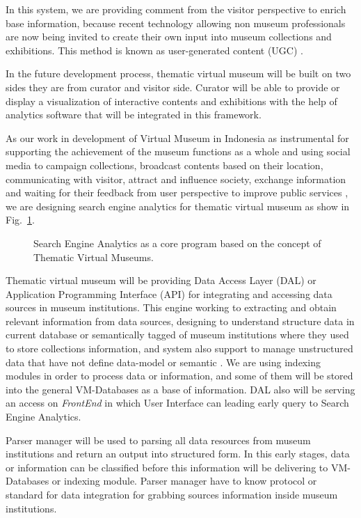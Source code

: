 In this system, we are providing comment from the visitor perspective to enrich base information, because recent technology allowing non museum professionals are now being invited to create their own input into museum collections and exhibitions. This method is known as user-generated content (UGC) \cite{HellinHobbs}.

In the future development process, thematic virtual museum will be built on two sides they are from curator and visitor side. Curator will be able to provide or display a visualization of interactive contents and exhibitions with the help of analytics software that will be integrated in this framework.

As our work in development of Virtual Museum in Indonesia as instrumental for supporting the achievement of the museum functions as a whole and using social media to campaign collections, broadcast contents based on their location, communicating with visitor, attract and influence society, exchange information and waiting for their feedback from user perspective to improve public services \cite{AnggaiBlekanovSergeev2014}, we are designing search engine analytics for thematic virtual museum as show in Fig.~\cref{fig:searchEngineAnalytics}.

\begin{figure}[ht]
	\caption{Search Engine Analytics as a core program based on the concept of Thematic Virtual Museums.}\label{fig:searchEngineAnalytics}
\end{figure}

Thematic virtual museum will be providing Data Access Layer (DAL) or Application Programming Interface (API) for integrating and accessing data sources in museum institutions. This engine working to extracting and obtain relevant information from data sources, designing to understand structure data in current database or semantically tagged of museum institutions where they used to store collections information, and system also support to manage unstructured data that have not define data-model or semantic \cite{AnggaiBlekanovSergeev2014}. We are using indexing modules in order to process data or information, and some of them will be stored into the general VM-Databases as a base of information. DAL also will be serving an access on \textit{FrontEnd} in which User Interface can leading early query to Search Engine Analytics.

Parser manager will be used to parsing all data resources from museum institutions and return an output into structured form. In this early stages, data or information can be classified before this information will be delivering to VM-Databases or indexing module. Parser manager have to know protocol or standard for data integration for grabbing sources information inside museum institutions.

